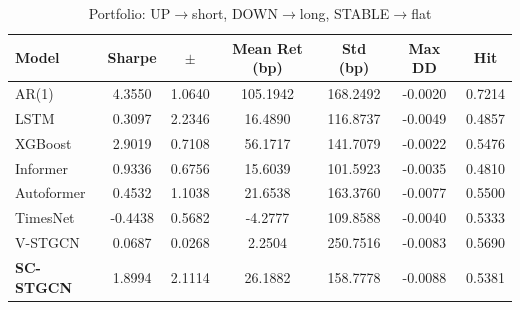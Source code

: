 \begin{table}[ht]\centering
\caption{Portfolio: UP$\to$short, DOWN$\to$long, STABLE$\to$flat}
\label{tab:port3opt}
\begin{tabular}{lcccccc}\toprule
Model & Sharpe & $\pm$ & Mean Ret (bp) & Std (bp) & Max DD & Hit \\\midrule
AR(1) & 4.3550 & 1.0640 & 105.1942 & 168.2492 & -0.0020 & 0.7214 \\
LSTM & 0.3097 & 2.2346 & 16.4890 & 116.8737 & -0.0049 & 0.4857 \\
XGBoost & 2.9019 & 0.7108 & 56.1717 & 141.7079 & -0.0022 & 0.5476 \\
Informer & 0.9336 & 0.6756 & 15.6039 & 101.5923 & -0.0035 & 0.4810 \\
Autoformer & 0.4532 & 1.1038 & 21.6538 & 163.3760 & -0.0077 & 0.5500 \\
TimesNet & -0.4438 & 0.5682 & -4.2777 & 109.8588 & -0.0040 & 0.5333 \\
V-STGCN & 0.0687 & 0.0268 & 2.2504 & 250.7516 & -0.0083 & 0.5690 \\
\textbf{SC-STGCN} & 1.8994 & 2.1114 & 26.1882 & 158.7778 & -0.0088 & 0.5381 \\
\bottomrule\end{tabular}\end{table}
